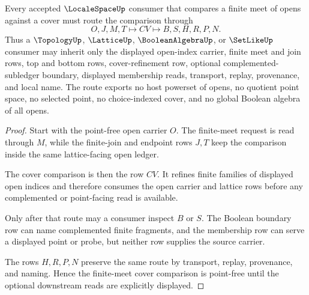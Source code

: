 \begin{theorem}
\label{thm:locale-space-finite-meet-cover-route}
Every accepted $\LocaleSpaceUp$ consumer that compares a finite meet of opens against a cover must route the comparison through
$$
O,J,M,T \longmapsto CV \longmapsto B,S,H,R,P,N .
$$
Thus a $\TopologyUp$, $\LatticeUp$, $\BooleanAlgebraUp$, or $\SetLikeUp$ consumer may inherit only the displayed open-index carrier, finite meet and join rows, top and bottom rows, cover-refinement row, optional complemented-subledger boundary, displayed membership reads, transport, replay, provenance, and local name. The route exports no host powerset of opens, no quotient point space, no selected point, no choice-indexed cover, and no global Boolean algebra of all opens.
\end{theorem}
\begin{proof}
Start with the point-free open carrier $O$. The finite-meet request is read through $M$, while the finite-join and endpoint rows $J,T$ keep the comparison inside the same lattice-facing open ledger.

The cover comparison is then the row $CV$. It refines finite families of displayed open indices and therefore consumes the open carrier and lattice rows before any complemented or point-facing read is available.

Only after that route may a consumer inspect $B$ or $S$. The Boolean boundary row can name complemented finite fragments, and the membership row can serve a displayed point or probe, but neither row supplies the source carrier.

The rows $H,R,P,N$ preserve the same route by transport, replay, provenance, and naming. Hence the finite-meet cover comparison is point-free until the optional downstream reads are explicitly displayed.
\end{proof}



